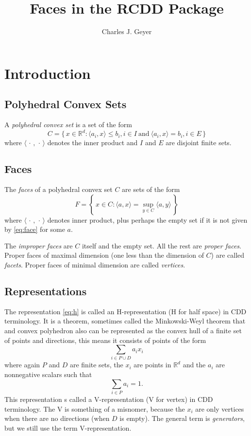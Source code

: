 \documentclass{article}
\newcommand{\set}[1]{\{\, #1 \,\}}
\newcommand{\bigset}[1]{\left\{\, #1 \,\right\}}
\newcommand{\inner}[1]{\langle #1 \rangle}
\newcommand{\mdot}{\,\cdot\,}
\newcommand{\real}{\mathbb{R}}
\begin{document}
\title{Faces in the RCDD Package}
\author{Charles J. Geyer}
\maketitle

\section{Introduction}

\subsection{Polyhedral Convex Sets}

A \emph{polyhedral convex set} is a set of the form
\begin{equation} \label{eq:h}
   C = \set{ x \in \real^d : \inner{a_i, x} \le b_i, i \in I \ \text{and}
               \ \inner{a_i, x}  =  b_i, i \in E }
\end{equation}
where $\inner{\mdot, \mdot}$ denotes the inner product and $I$ and $E$
are disjoint finite sets.

\subsection{Faces}

The \emph{faces} of a polyhedral convex set $C$ are sets of the form
\begin{equation} \label{eq:face}
   F = \bigset{ x \in C : \inner{a, x} = \sup_{y \in C} \inner{a, y} }
\end{equation}
where $\inner{\mdot, \mdot}$ denotes inner product, plus perhaps the
empty set if it is not given by \eqref{eq:face} for some $a$.

The \emph{improper faces} are $C$ itself and the empty set.
All the rest are \emph{proper faces}.  Proper faces of maximal
dimension (one less than the dimension of $C$) are called \emph{facets}.
Proper faces of minimal dimension are called \emph{vertices}.

\subsection{Representations}

The representation \eqref{eq:h} is called an H-representation
(H for half space) in CDD terminology.  It is a theorem, sometimes
called the Minkowski-Weyl theorem that and convex polyhedron also
can be represented as the convex hull of a finite set of points
and directions, this means it consists of points of the form
$$
   \sum_{i \in P \cup D} a_i x_i
$$
where again $P$ and $D$ are finite sets, the $x_i$ are points in $\real^d$
and the $a_i$ are nonnegative scalars such that
$$
   \sum_{i \in P} a_i = 1.
$$
This representation s called a V-representation
(V for vertex) in CDD terminology.  The V is something of a misnomer,
because the $x_i$ are only vertices when there are no directions
(when $D$ is empty).  The general term is \emph{generators}, but we
still use the term V-representation.
\end{document}
